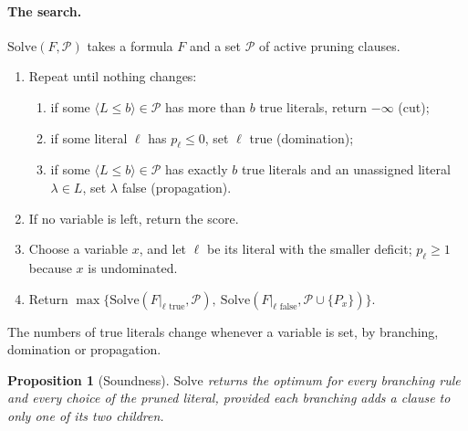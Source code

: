 \documentclass[11pt,a4paper]{article}
\newtheorem{proposition}[theorem]{Proposition}
\theoremstyle{remark}
\begin{document}
\paragraph{The search.} $\mathrm{Solve}(F,\mathcal P)$ takes a formula $F$ and
a set $\mathcal P$ of active pruning clauses.
\begin{enumerate}
 \item Repeat until nothing changes:
 \begin{enumerate}
  \item[(a)] if some $\langle L\le b\rangle\in\mathcal P$ has more than $b$ true
  literals, return $-\infty$ (cut);
  \item[(b)] if some literal $\ell$ has $p_\ell\le0$, set $\ell$ true
  (domination);
  \item[(c)] if some $\langle L\le b\rangle\in\mathcal P$ has exactly $b$ true
  literals and an unassigned literal $\lambda\in L$, set $\lambda$ false
  (propagation).
 \end{enumerate}
 \item If no variable is left, return the score.
 \item Choose a variable $x$, and let $\ell$ be its literal with the smaller
 deficit; $p_\ell\ge1$ because $x$ is undominated.
 \item Return $\max\bigl\{\mathrm{Solve}(F|_{\ell\text{ true}},\mathcal P),\
 \mathrm{Solve}(F|_{\ell\text{ false}},\mathcal P\cup\{P_x\})\bigr\}$.
\end{enumerate}
The numbers of true literals change whenever a variable is set, by branching,
domination or propagation.

\begin{proposition}[Soundness]\label{prop:sound}
$\mathrm{Solve}$ returns the optimum for every branching rule and every choice
of the pruned literal, provided each branching adds a clause to only one of its
two children.
\end{proposition}
\end{document}
